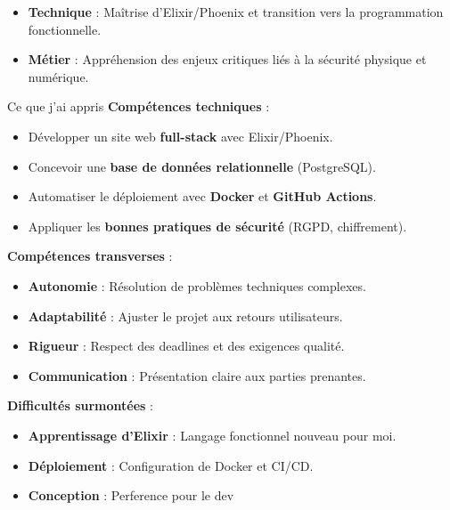 \begin{itemize}
    \item \textbf{Technique} : Maîtrise d’Elixir/Phoenix et transition vers la programmation fonctionnelle.
    \item \textbf{Métier} : Appréhension des enjeux critiques liés à la sécurité physique et numérique.
    \newline
\end{itemize}

\begin{for_you}{Ce que j’ai appris}
    \textbf{Compétences techniques} :
    \begin{itemize}
        \item Développer un site web \textbf{full-stack} avec Elixir/Phoenix.
        \item Concevoir une \textbf{base de données relationnelle} (PostgreSQL).
        \item Automatiser le déploiement avec \textbf{Docker} et \textbf{GitHub Actions}.
        \item Appliquer les \textbf{bonnes pratiques de sécurité} (RGPD, chiffrement).
        \newline
    \end{itemize}

    \textbf{Compétences transverses} :
    \begin{itemize}
        \item \textbf{Autonomie} : Résolution de problèmes techniques complexes.
        \item \textbf{Adaptabilité} : Ajuster le projet aux retours utilisateurs.
        \item \textbf{Rigueur} : Respect des deadlines et des exigences qualité.
        \item \textbf{Communication} : Présentation claire aux parties prenantes.
        \newline
    \end{itemize}

    \textbf{Difficultés surmontées} :
    \begin{itemize}
        \item \textbf{Apprentissage d’Elixir} : Langage fonctionnel nouveau pour moi.
        \item \textbf{Déploiement} : Configuration de Docker et CI/CD.
        \item \textbf{Conception} : Perference pour le dev
        \newline
    \end{itemize}
\end{for_you}

